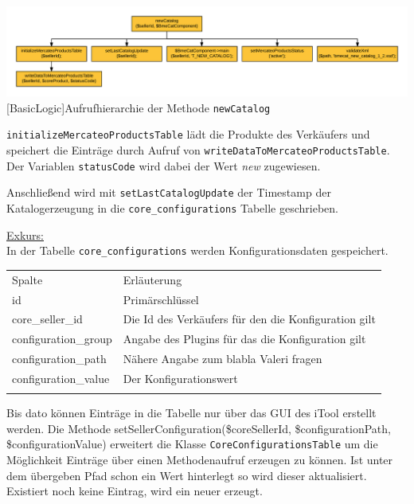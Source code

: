 	\begin{minipage}{\linewidth}
		\vspace{1em}
		\centering
		\includegraphics[width=1 \linewidth]{img/newCatalogAufrufhierarchie}
		[BasicLogic]{Aufrufhierarchie der Methode \texttt{newCatalog}}
		\vspace{1em}
	\end{minipage}
	
	\texttt{initializeMercateoProductsTable} lädt die Produkte des Verkäufers und speichert die Einträge durch Aufruf von \texttt{writeDataToMercateoProductsTable}. Der Variablen \texttt{statusCode} wird dabei der Wert \textit{new} zugewiesen. 
	
	Anschließend wird mit \texttt{setLastCatalogUpdate} der Timestamp der Katalogerzeugung in die \texttt{core\_configurations} Tabelle geschrieben.
	
	\begin{addmargin}[1cm]{1cm}
	\underline{Exkurs:}\\
	 In der Tabelle \texttt{core\_configurations} werden Konfigurationsdaten gespeichert. 

	 
	 \begin{table}[!htbp]
	 \begin{addmargin}[1cm]{1cm}
	 \centering
	 		\begin{tabularx}{\linewidth}{p{4cm} X}
	 		\rowcolor[HTML]{EFEFEF} 
	 		Spalte & Erläuterung \\ \cline{1-2} \addlinespace[7pt]
	 		id & Primärschlüssel \\
	 		core\_seller\_id & Die Id des Verkäufers für den die Konfiguration gilt \\
	 		configuration\_group & Angabe des Plugins für das die Konfiguration gilt \\
	 		configuration\_path & Nähere Angabe zum blabla Valeri fragen \\
	 		configuration\_value & Der Konfigurationswert \\\addlinespace[7pt] \cline{1-2} 
	 		\end{tabularx}%
	 	\end{addmargin}
	 	\end{table}
	 
	 Bis dato können Einträge in die Tabelle nur über das GUI des iTool erstellt werden. Die Methode setSellerConfiguration(\$coreSellerId, \$configurationPath, \$configurationValue) erweitert die Klasse \texttt{CoreConfigurationsTable} um die Möglichkeit Einträge über einen Methodenaufruf erzeugen zu können. Ist unter dem übergeben Pfad schon ein Wert hinterlegt so wird dieser aktualisiert. Existiert noch keine Eintrag, wird ein neuer erzeugt.
	\end{addmargin}
	
